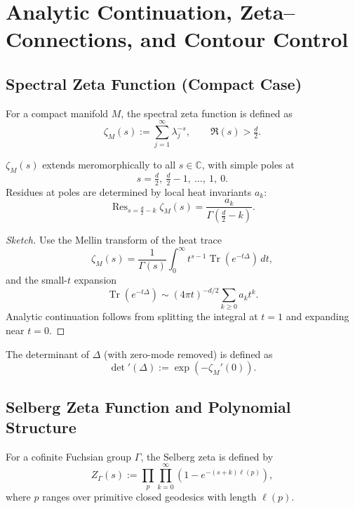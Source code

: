 \section{Analytic Continuation, Zeta–Connections, and Contour Control}
\label{sec:analytic-continuation}

\subsection{Spectral Zeta Function (Compact Case)}

\begin{definition}
For a compact manifold $M$, the spectral zeta function is defined as
\[
\zeta_M(s) := \sum_{j=1}^\infty \lambda_j^{-s}, \qquad \Re(s) > \tfrac{d}{2}.
\]
\end{definition}

\begin{theorem}
\label{thm:zetaM}
$\zeta_M(s)$ extends meromorphically to all $s\in\mathbb{C}$, with simple poles at
\[
s = \tfrac{d}{2}, \ \tfrac{d}{2}-1, \ \dots, \ 1, \ 0.
\]
Residues at poles are determined by local heat invariants $a_k$:
\[
\operatorname{Res}_{s=\frac{d}{2}-k}\zeta_M(s) = \frac{a_k}{\Gamma(\tfrac{d}{2}-k)}.
\]
\end{theorem}

\begin{proof}[Sketch]
Use the Mellin transform of the heat trace
\[
\zeta_M(s) = \frac{1}{\Gamma(s)} \int_0^\infty t^{s-1}\operatorname{Tr}(e^{-t\Delta})\,dt,
\]
and the small-$t$ expansion
\[
\operatorname{Tr}(e^{-t\Delta}) \sim (4\pi t)^{-d/2}\sum_{k\ge0} a_k t^k.
\]
Analytic continuation follows from splitting the integral at $t=1$ and expanding near $t=0$.
\end{proof}

\begin{remark}
The determinant of $\Delta$ (with zero-mode removed) is defined as
\[
\det{}'(\Delta) := \exp(-\zeta_M'(0)).
\]
\end{remark}

\subsection{Selberg Zeta Function and Polynomial Structure}

\begin{definition}
\label{def:selberg-zeta}
For a cofinite Fuchsian group $\Gamma$, the Selberg zeta is defined by
\[
Z_\Gamma(s) := \prod_{p} \prod_{k=0}^\infty \left(1 - e^{-(s+k)\ell(p)}\right),
\]
where $p$ ranges over primitive closed geodesics with length $\ell(p)$.
\end{definition}

